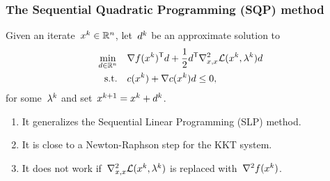 \documentclass{polyu-presentation}
\newcommand{\con}[1][]{c\ifthenelse{\equal{#1}{}}{}{_{#1}}}
\newcommand{\iter}[1][]{x\ifthenelse{\equal{#1}{}}{}{^{#1}}}
\newcommand{\lag}[1][]{\mathcal{L}\ifthenelse{\equal{#1}{}}{}{^{#1}}}
\newcommand{\lm}[1][]{\lambda\ifthenelse{\equal{#1}{}}{}{^{#1}}}
\newcommand{\obj}{f}
\newcommand{\step}[1][]{d\ifthenelse{\equal{#1}{}}{}{^{#1}}}
\begin{document}
\begin{frame}
    \frametitle{The Sequential Quadratic Programming (SQP) method}
    
	Given an iterate~$\iter[k] \in \R^n$, let~$\step[k]$ be an approximate solution to
    \begin{align*}
        \min_{\step \in \R^n}   & \quad \nabla \obj(\iter[k])^{\T} \step + \frac{1}{2} \step^{\T} \nabla_{x, x}^2 \lag(\iter[k], \lm[k]) \step\\
        \text{s.t.}             & \quad \con(\iter[k]) + \nabla \con(\iter[k]) \step \le 0,
    \end{align*}
    for some~$\lm[k]$ and set~$\iter[k + 1] = \iter[k] + \step[k]$.
    
    \medskip

    \begin{block}{}
        \begin{enumerate}
            \item It generalizes the \alert{Sequential Linear Programming} (SLP) method.
            \item It is close to a \alert{Newton-Raphson} step for the KKT system.
            \item It does not work if~$\nabla_{x, x}^2 \lag(\iter[k], \lm[k])$ is replaced with~$\nabla^2 \obj(\iter[k])$.
        \end{enumerate}
    \end{block}
\end{frame}
\end{document}
